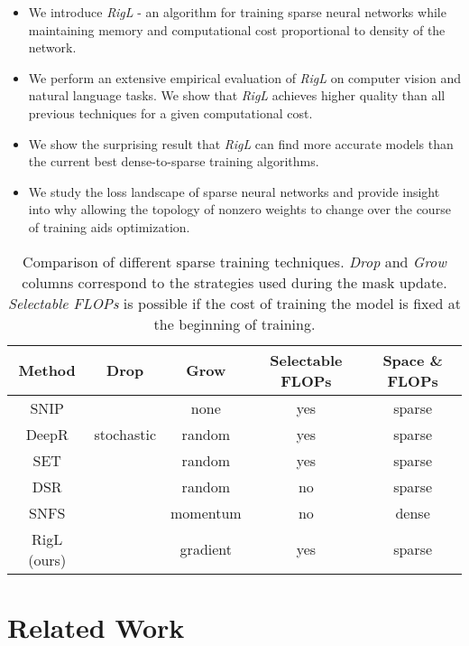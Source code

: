 \documentclass{article}
\begin{document}
\begin{itemize}
  \setlength\itemsep{.1em}
  \item  We introduce \textit{RigL} - an algorithm for training sparse neural networks while maintaining memory and computational cost proportional to density of the network.
  \item We perform an extensive empirical evaluation of \textit{RigL} on computer vision and natural language tasks. We show that \textit{RigL} achieves higher quality than all previous techniques for a given computational cost.
  \item We show the surprising result that \textit{RigL} can find more accurate models than the current best dense-to-sparse training algorithms.
  \item We study the loss landscape of sparse neural networks and provide insight into why allowing the topology of nonzero weights to change over the course of training aids optimization.
\end{itemize}







\begin{table*}
    \centering
    \begin{tabular}{c|c|c|c|c}
        Method & Drop & Grow & Selectable FLOPs & Space \& FLOPs  \\\hline
        SNIP &  & none & yes & sparse \\
        DeepR & stochastic& random & yes & sparse\\
        SET  &  & random & yes & sparse  \\
        DSR  &  & random & no & sparse \\
        SNFS &  & momentum & no & dense \\
        RigL (ours) &  & gradient & yes & sparse \\
    \end{tabular}
    \caption{Comparison of different sparse training techniques. \textit{Drop} and \textit{Grow}
    columns correspond to the strategies used during the mask update. \textit{Selectable FLOPs} is possible if the cost of training the model is fixed at the beginning of training.}
    \label{tab:methods}
\end{table*}



\section{Related Work}
\end{document}
